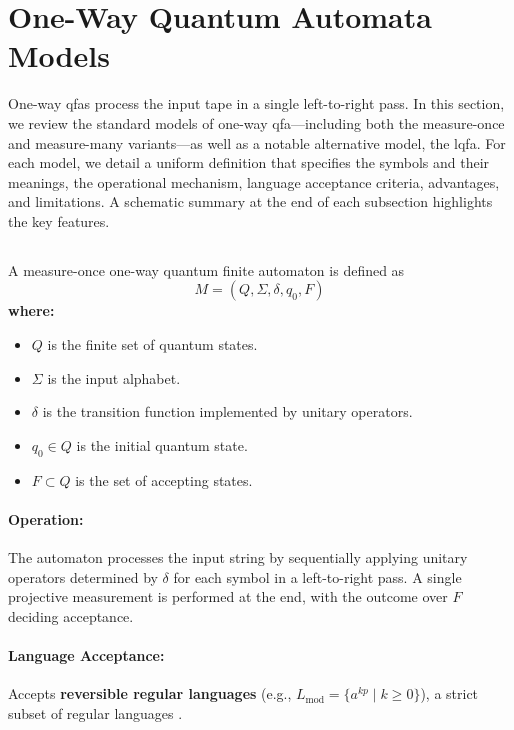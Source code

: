 \section{One-Way Quantum Automata Models}
\label{sec:one-way-qfas}

One-way \glspl{qfa} process the input tape in a single left-to-right pass. In this section, we review the standard models of one-way \gls{qfa}—including both the measure-once and measure-many variants—as well as a notable alternative model, the \gls{lqfa}. For each model, we detail a uniform definition that specifies the symbols and their meanings, the operational mechanism, language acceptance criteria, advantages, and limitations. A schematic summary at the end of each subsection highlights the key features.

\subsection{}
\label{subsec:mo-1qfa}
\begin{definition}
A measure-once one-way quantum finite automaton is defined as 
\[
M = (Q, \Sigma, \delta, q_0, F)
\]
\textbf{where:}
\begin{itemize}
    \item \( Q \) is the finite set of quantum states.
    \item \( \Sigma \) is the input alphabet.
    \item \( \delta \) is the transition function implemented by unitary operators.
    \item \( q_0 \in Q \) is the initial quantum state.
    \item \( F \subset Q \) is the set of accepting states.
\end{itemize}
\end{definition}

\paragraph{Operation:}  
The automaton processes the input string by sequentially applying unitary operators determined by \( \delta \) for each symbol in a left-to-right pass. A single projective measurement is performed at the end, with the outcome over \( F \) deciding acceptance.

\paragraph{Language Acceptance:}  
Accepts \textbf{reversible regular languages} (e.g., \( L_{\text{mod}} = \{a^{kp} \mid k \geq 0\} \)), a strict subset of regular languages \cite{kondacs1997power}.
